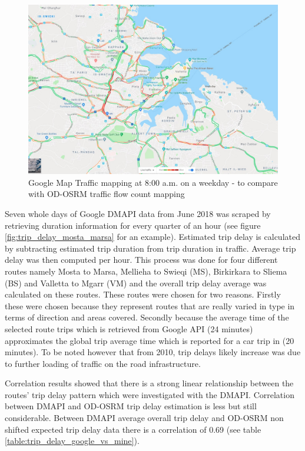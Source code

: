 \documentclass[12pt, a4paper]{report}
\theoremstyle{definition}
\theoremstyle{definition}%
\theoremstyle{definition}%
\theoremstyle{definition}%
\theoremstyle{definition}%
\theoremstyle{definition}%
\begin{document}
\begin{figure}[!]	
	\includegraphics[scale=0.4]{google_traffic_900am.jpg}
	\centering
	\caption[Google Map Traffic delay mapping]{Google Map Traffic mapping at 8:00 a.m. on a weekday - to compare with OD-OSRM traffic flow count mapping}
	\label{fig:trip_delay_google_900am}
\end{figure}
 

Seven whole days of Google DMAPI data from June 2018 was scraped by retrieving duration information for every quarter of an hour (see figure \ref{fig:trip_delay_mosta_marsa} for an example). Estimated trip delay is calculated by subtracting estimated trip duration from trip duration in traffic. Average trip delay was then computed per hour. This process was done for four different routes namely Mosta to Marsa, Mellieha to Swieqi (MS), Birkirkara to Sliema (BS) and Valletta to Mgarr (VM) and the overall trip delay average was calculated on these routes. These routes were chosen for two reasons. Firstly these were chosen because they represent routes that are really varied in type in terms of direction and areas covered. Secondly because the average time of the selected route trips which is retrieved from Google API (24 minutes) approximates the global trip average time which is reported for a car trip in \cite{malta2011national} (20 minutes). To be noted however that from 2010, trip delays likely increase was due to further loading of traffic on the road infrastructure.

Correlation results showed that there is a strong linear relationship between the routes' trip delay pattern which were investigated with the DMAPI. Correlation between DMAPI and OD-OSRM trip delay estimation is less but still considerable. Between DMAPI average overall trip delay and OD-OSRM non shifted expected trip delay data there is a correlation of 0.69 (see table \ref{table:trip_delay_google_vs_mine}).
\end{document}
